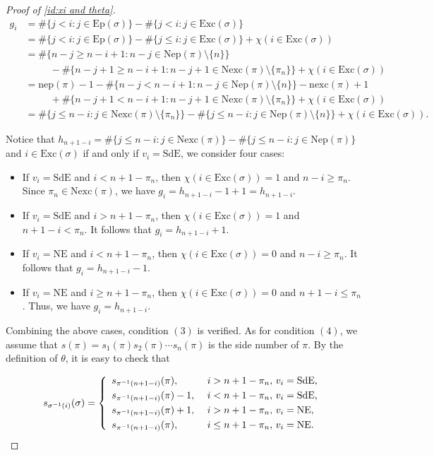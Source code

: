 \documentclass[12pt]{amsart}
\numberwithin{equation}{section}
\theoremstyle{plain}
\theoremstyle{definition}
\def\NE{\mathrm{NE}}
\def\SdE{\mathrm{SdE}}
\def\Excp{\mathrm{Ep}}
\def\Exc{\mathrm{Exc}}
\def\Nexc{\mathrm{Nexc}}
\def\Nexcp{\mathrm{Nep}}
\def\nep{\mathrm{nep}}
\def\nexc{\mathrm{nexc}}
\begin{document}
\begin{proof}[Proof of \eqref{id:xi and theta}]
\begin{align*}
     g_i  & =\#\{j<i: j \in \Excp(\sigma)\}-\#\{j<i: j \in \Exc(\sigma)\}\\[3pt]
     & =\#\{j<i: j \in \Excp(\sigma)\}-\#\{j\leq i: j \in \Exc(\sigma)\}
     +\chi(i \in \Exc(\sigma))\\[3pt]
     &=\#\{n-j \geq n-i+1: n-j \in \Nexcp(\pi)\setminus \{n\}\}\\[3pt]
   &\,\,\,\,\,\,\,\,\,\,\,\,\,\,\,-\#\{n-j+1 \geq n-i+1: n-j+1 \in \Nexc(\pi)\setminus \{\pi_n\}\}
    +\chi(i \in \Exc(\sigma))\\[3pt]
   &=   \nep(\pi) -1-\#\{n-j < n-i+1: n-j \in \Nexcp(\pi)\setminus \{n\}\}-\nexc(\pi)+1 \\[3pt]
   &\,\,\,\,\,\,\,\,\,\,\,\,\,\,\,+\#\{n-j+1 < n-i+1: n-j+1 \in \Nexc(\pi)\setminus \{\pi_n\}\} + \chi(i \in \Exc(\sigma))   \\[3pt]
   &=  \#\{j \le n-i: j \in \Nexc(\pi)\setminus \{\pi_n\}\} -\#\{j \le n-i: j \in \Nexcp(\pi)\setminus \{n\}\} + \chi(i \in \Exc(\sigma)).
\end{align*}

Notice that $h_{n+1-i}=\#\{j\le n-i: j \in \Nexc(\pi)\}-\#\{j\le n-i: j \in \Nexcp(\pi)\}$ and $i \in \Exc(\sigma)$ if and only if $v_i=\SdE$, we consider four cases:
\begin{itemize}
  \item [I.] If $v_i=\SdE$ and $i<n+1-\pi_n$, then $\chi(i \in \Exc(\sigma))=1$ and $n-i\ge \pi_n$. Since  $\pi_n \in \Nexc(\pi)$, we have $g_i=h_{n+1-i}-1+1=h_{n+1-i}$.
  \item [II.]If $v_i=\SdE$ and $i>n+1-\pi_n$, then $\chi(i \in \Exc(\sigma))=1$ and $n+1-i<\pi_n$. It follows that 
  $g_i=h_{n+1-i}+1$.
  \item [III.]If $v_i=\NE$ and $i<n+1-\pi_n$, then $\chi(i \in \Exc(\sigma))=0$ and $n-i\ge \pi_n$. It follows that
  $g_i=h_{n+1-i}-1$.
  \item [IV.]If $v_i=\NE$ and $i \geq n+1-\pi_n$, then $\chi(i \in \Exc(\sigma))=0$ and $n+1-i \leq \pi_n$. Thus, we have 
  $g_i=h_{n+1-i}$.
\end{itemize}
Combining the above cases, condition $(3)$ is verified.
As for condition $(4)$, we assume that $s(\pi)=s_1(\pi)s_2(\pi)\cdots s_n(\pi)$ is the side number of $\pi$. By the definition of $\theta$, it is easy to check that

\begin{equation}\label{eq:srelation}
s_{\sigma^{-1}(i)}(\sigma)= \left\{
  \begin{array}{ll}
s_{\pi^{-1}(n+1-i)}(\pi), & \mbox{ $ i>n+1-\pi_n,\, v_i=\SdE$,}\\[3pt]
s_{\pi^{-1}(n+1-i)}(\pi)-1, & \mbox{ $ i<n+1-\pi_n,\, v_i=\SdE$,}\\[3pt]
s_{\pi^{-1}(n+1-i)}(\pi)+1, & \mbox{ $ i>n+1-\pi_n,\, v_i=\NE$,}\\[3pt]
s_{\pi^{-1}(n+1-i)}(\pi),  & \mbox{ $ i\leq n+1-\pi_n,\, v_i=\NE$.}
 \end{array} \right.
\end{equation}


\end{proof}
\end{document}
